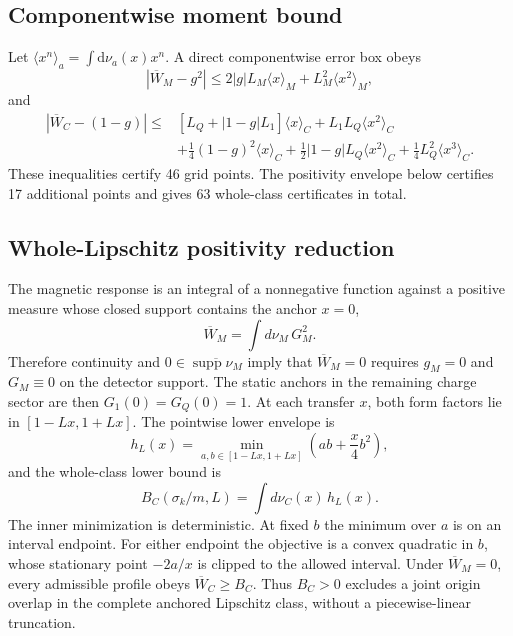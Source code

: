 \documentclass[12pt]{iopjournal}
\newcommand{\dd}{\mathrm d}
\begin{document}
\subsection{Componentwise moment bound}

Let $\langle x^n\rangle_a=\int\dd\nu_a(x)x^n$. A direct componentwise error box obeys
\begin{equation}
|\overline W_M-g^2|
\le2|g|L_M\langle x\rangle_M+L_M^2\langle x^2\rangle_M,
\end{equation}
and
\begin{align}
|\overline W_C-(1-g)|\le{}&
[L_Q+|1-g|L_1]\langle x\rangle_C
+L_1L_Q\langle x^2\rangle_C
\nonumber\\
&+\frac14(1-g)^2\langle x\rangle_C
+\frac12|1-g|L_Q\langle x^2\rangle_C
+\frac14L_Q^2\langle x^3\rangle_C.
\end{align}
These inequalities certify 46 grid points. The positivity envelope below certifies 17 additional points and gives 63 whole-class certificates in total.

\subsection{Whole-Lipschitz positivity reduction}

The magnetic response is an integral of a nonnegative function against a positive measure whose closed support contains the anchor $x=0$,
\begin{equation}
\overline W_M=\int d\nu_M\,G_M^2.
\end{equation}
Therefore continuity and $0\in\overline{\operatorname{supp}\nu_M}$ imply that $\overline W_M=0$ requires $g_M=0$ and $G_M\equiv0$ on the detector support. The static anchors in the remaining charge sector are then $G_1(0)=G_Q(0)=1$. At each transfer $x$, both form factors lie in $[1-Lx,1+Lx]$. The pointwise lower envelope is
\begin{equation}
h_L(x)=\min_{a,b\in[1-Lx,1+Lx]}
\left(ab+\frac{x}{4}b^2\right),
\end{equation}
and the whole-class lower bound is
\begin{equation}
B_C(\sigma_k/m,L)=\int d\nu_C(x)\,h_L(x).
\end{equation}
The inner minimization is deterministic. At fixed $b$ the minimum over $a$ is on an interval endpoint. For either endpoint the objective is a convex quadratic in $b$, whose stationary point $-2a/x$ is clipped to the allowed interval. Under $\overline W_M=0$, every admissible profile obeys $\overline W_C\ge B_C$. Thus $B_C>0$ excludes a joint origin overlap in the complete anchored Lipschitz class, without a piecewise-linear truncation.
\end{document}
